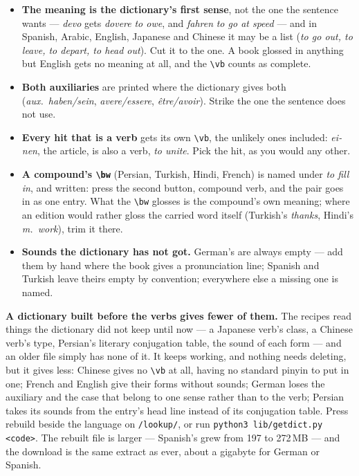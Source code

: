 \documentclass[11pt,oneside]{report}
\newcommand{\iw}[1]{\foreignlanguage{italian}{\emph{#1}}}
\newcommand{\gw}[1]{\foreignlanguage{ngerman}{\emph{#1}}}
\newcommand{\menu}[1]{\textsf{#1}}
\begin{document}
\begin{itemize}
\item \textbf{The meaning is the dictionary's first sense}, not the one the
  sentence wants --- \iw{devo} gets \iw{dovere} \emph{to owe}, and
  \gw{fahren} \emph{to go at speed} --- and in Spanish, Arabic, English,
  Japanese and Chinese it may be a list (\emph{to go out, to leave, to
  depart, to head out}). Cut it to the one. A book glossed in anything but
  English gets no meaning at all, and the \texttt{\textbackslash vb} counts
  as complete.
\item \textbf{Both auxiliaries} are printed where the dictionary gives both
  (\emph{aux.\ haben/sein}, \emph{avere/essere}, \emph{être/avoir}). Strike
  the one the sentence does not use.
\item \textbf{Every hit that is a verb} gets its own
  \texttt{\textbackslash vb}, the unlikely ones included: \gw{einen}, the
  article, is also a verb, \emph{to unite}. Pick the hit, as you would any
  other.
\item \textbf{A compound's \texttt{\textbackslash bw}} (Persian, Turkish,
  Hindi, French) is named under \emph{to fill in}, and written: press the
  second button, \menu{compound verb}, and the pair goes in as one entry.
  What the \texttt{\textbackslash bw} glosses is the compound's own
  meaning; where an edition would rather gloss the carried word itself
  (Turkish's \emph{thanks}, Hindi's \emph{m.\ work}), trim it there.
\item \textbf{Sounds the dictionary has not got.} German's are always
  empty --- add them by hand where the book gives a pronunciation line;
  Spanish and Turkish leave theirs empty by convention; everywhere else a
  missing one is named.
\end{itemize}

\begin{goodbox}
\textbf{A dictionary built before the verbs gives fewer of them.} The
recipes read things the dictionary did not keep until now --- a
Japanese verb's class, a Chinese verb's type, Persian's literary conjugation
table, the sound of each form --- and an older file simply has none of it.
It keeps working, and nothing needs deleting, but it gives less: Chinese
gives no \texttt{\textbackslash vb} at all, having no standard pinyin to put
in one; French and English give their forms without sounds; German loses
the auxiliary and the case that belong to one sense rather than to the
verb; Persian takes its sounds from the entry's head line instead of its
conjugation table. Press \menu{rebuild} beside the language on
\texttt{/lookup/}, or run \texttt{python3 lib/getdict.py <code>}. The
rebuilt file is larger --- Spanish's grew from 197 to 272\,MB --- and the
download is the same extract as ever, about a gigabyte for German or
Spanish.
\end{goodbox}
\end{document}
